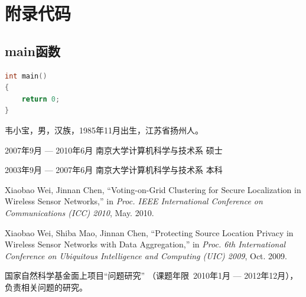 \documentclass[winfonts,bachelor,twoside]{njuthesis}
\begin{document}
\begin{acknowledgement}
\lipsum[1]

\end{acknowledgement}








\appendix
\chapter{附录代码}\label{app:1}
\section{main函数}
\begin{lstlisting}[language=C]
int main()
{
	return 0;
}
\end{lstlisting}

\backmatter
\begin{resume}
\begin{authorinfo}
\noindent 韦小宝，男，汉族，1985年11月出生，江苏省扬州人。
\end{authorinfo}
\begin{education}
\item[2007年9月 --- 2010年6月] 南京大学计算机科学与技术系 \hfill 硕士
\item[2003年9月 --- 2007年6月] 南京大学计算机科学与技术系 \hfill 本科
\end{education}
\begin{publications}
\item Xiaobao Wei, Jinnan Chen, ``Voting-on-Grid Clustering for Secure
  Localization in Wireless Sensor Networks,'' in \textsl{Proc. IEEE International
    Conference on Communications (ICC) 2010}, May. 2010.
\item Xiaobao Wei, Shiba Mao, Jinnan Chen, ``Protecting Source Location Privacy
  in Wireless Sensor Networks with Data Aggregation,'' in \textsl{Proc. 6th
    International Conference on Ubiquitous Intelligence and Computing (UIC)
    2009}, Oct. 2009.
\end{publications}
\begin{projects}
\item 国家自然科学基金面上项目``问题研究''
（课题年限~2010年1月 --- 2012年12月），负责相关问题的研究。
\end{projects}
\end{resume}

\makelicense

\end{document}
